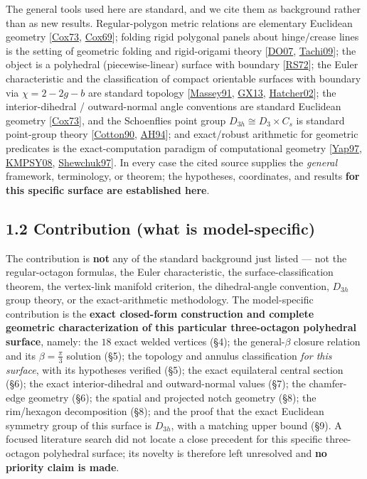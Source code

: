 \documentclass[
  11pt,
  a4paper,
]{article}
\begin{document}
The general tools used here are standard, and we cite them as background rather than as new results. Regular-polygon metric relations are elementary Euclidean geometry {[}\hyperlink{ref-Cox73}{Cox73}, \hyperlink{ref-Cox69}{Cox69}{]}; folding rigid polygonal panels about hinge/crease lines is the setting of geometric folding and rigid-origami theory {[}\hyperlink{ref-DO07}{DO07}, \hyperlink{ref-Tachi09}{Tachi09}{]}; the object is a polyhedral (piecewise-linear) surface with boundary {[}\hyperlink{ref-RS72}{RS72}{]}; the Euler characteristic and the classification of compact orientable surfaces with boundary via \(\chi=2-2g-b\) are standard topology {[}\hyperlink{ref-Massey91}{Massey91}, \hyperlink{ref-GX13}{GX13}, \hyperlink{ref-Hatcher02}{Hatcher02}{]}; the interior-dihedral / outward-normal angle conventions are standard Euclidean geometry {[}\hyperlink{ref-Cox73}{Cox73}{]}, and the Schoenflies point group \(D_{3h}\cong D_3\times C_s\) is standard point-group theory {[}\hyperlink{ref-Cotton90}{Cotton90}, \hyperlink{ref-AH94}{AH94}{]}; and exact/robust arithmetic for geometric predicates is the exact-computation paradigm of computational geometry {[}\hyperlink{ref-Yap97}{Yap97}, \hyperlink{ref-KMPSY08}{KMPSY08}, \hyperlink{ref-Shewchuk97}{Shewchuk97}{]}. In every case the cited source supplies the \emph{general} framework, terminology, or theorem; the hypotheses, coordinates, and results \textbf{for this specific surface are established here}.

\subsection{1.2 Contribution (what is model-specific)}\label{contribution-what-is-model-specific}

The contribution is \textbf{not} any of the standard background just listed --- not the regular-octagon formulas, the Euler characteristic, the surface-classification theorem, the vertex-link manifold criterion, the dihedral-angle convention, \(D_{3h}\) group theory, or the exact-arithmetic methodology. The model-specific contribution is the \textbf{exact closed-form construction and complete geometric characterization of this particular three-octagon polyhedral surface}, namely: the \(18\) exact welded vertices (§4); the general-\(\beta\) closure relation and its \(\beta=\tfrac{\pi}{3}\) solution (§5); the topology and annulus classification \emph{for this surface}, with its hypotheses verified (§5); the exact equilateral central section (§6); the exact interior-dihedral and outward-normal values (§7); the chamfer-edge geometry (§6); the spatial and projected notch geometry (§8); the rim/hexagon decomposition (§8); and the proof that the exact Euclidean symmetry group of this surface is \(D_{3h}\), with a matching upper bound (§9). A focused literature search did not locate a close precedent for this specific three-octagon polyhedral surface; its novelty is therefore left unresolved and \textbf{no priority claim is made}.
\end{document}

